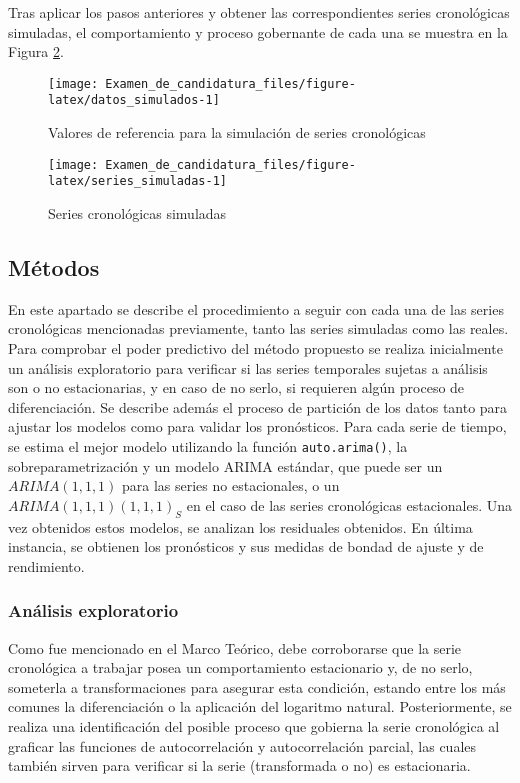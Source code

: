 \documentclass[
]{article}
\begin{document}
Tras aplicar los pasos anteriores y obtener las correspondientes series
cronológicas simuladas, el comportamiento y proceso gobernante de cada
una se muestra en la Figura \ref{fig:series_simuladas}.

\begin{figure}[H]
\texttt{[image: Examen\_de\_candidatura\_files/figure-latex/datos\_simulados-1]} \caption{Valores de referencia para la simulación de series cronológicas}\label{fig:datos_simulados}
\end{figure}

\begin{figure}[H]
\texttt{[image: Examen\_de\_candidatura\_files/figure-latex/series\_simuladas-1]} \caption{Series cronológicas simuladas}\label{fig:series_simuladas}
\end{figure}

\subsection{Métodos}

En este apartado se describe el procedimiento a seguir con cada una de
las series cronológicas mencionadas previamente, tanto las series
simuladas como las reales. Para comprobar el poder predictivo del método
propuesto se realiza inicialmente un análisis exploratorio para
verificar si las series temporales sujetas a análisis son o no
estacionarias, y en caso de no serlo, si requieren algún proceso de
diferenciación. Se describe además el proceso de partición de los datos
tanto para ajustar los modelos como para validar los pronósticos. Para
cada serie de tiempo, se estima el mejor modelo utilizando la función
\texttt{auto.arima()}, la sobreparametrización y un modelo ARIMA
estándar, que puede ser un \(ARIMA(1,1,1)\) para las series no
estacionales, o un \(ARIMA(1,1,1)(1,1,1)_S\) en el caso de las series
cronológicas estacionales. Una vez obtenidos estos modelos, se analizan
los residuales obtenidos. En última instancia, se obtienen los
pronósticos y sus medidas de bondad de ajuste y de rendimiento.

\subsubsection{Análisis exploratorio}

Como fue mencionado en el Marco Teórico, debe corroborarse que la serie
cronológica a trabajar posea un comportamiento estacionario y, de no
serlo, someterla a transformaciones para asegurar esta condición,
estando entre los más comunes la diferenciación o la aplicación del
logaritmo natural. Posteriormente, se realiza una identificación del
posible proceso que gobierna la serie cronológica al graficar las
funciones de autocorrelación y autocorrelación parcial, las cuales
también sirven para verificar si la serie (transformada o no) es
estacionaria.
\end{document}
